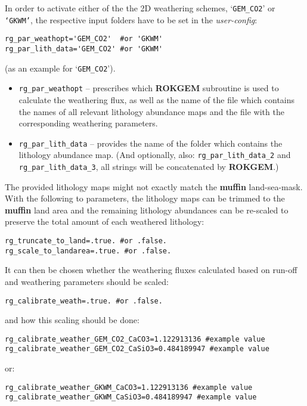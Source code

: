 \vspace{1mm}
In order to activate either of the the 2D weathering schemes, ‘\texttt{GEM\_CO2}’ or \texttt{‘GKWM’},  the respective input folders have to be set in the \textit{user-config}:
\vspace{-1mm}\small\begin{verbatim}
rg_par_weathopt='GEM_CO2'  #or 'GKWM' 
rg_par_lith_data='GEM_CO2' #or 'GKWM' 
\end{verbatim}\normalsize\vspace{-1mm}
(as an example for ‘\texttt{GEM\_CO2}’).

\begin{itemize}[noitemsep]
\item \texttt{rg\_par\_weathopt} -- prescribes which \textbf{ROKGEM} subroutine is used to calculate the weathering flux, as well as the name of the file which contains the names of all relevant lithology abundance maps and the file with the corresponding weathering parameters. 
\item \texttt{rg\_par\_lith\_data} -- provides the name of the folder which contains the lithology abundance map. (And optionally, also: \texttt{rg\_par\_lith\_data\_2} and \texttt{rg\_par\_lith\_data\_3}, all strings will be concatenated by \textbf{ROKGEM}.)
\end{itemize}

\vspace{1mm}
The provided lithology maps might not exactly match the \textbf{muffin} land-sea-mask. With the following to parameters, the lithology maps can be trimmed to the \textbf{muffin} land area and the remaining lithology abundances can be re-scaled to preserve the total amount of each weathered lithology:
\vspace{-1mm}\small\begin{verbatim}
rg_truncate_to_land=.true. #or .false.
rg_scale_to_landarea=.true. #or .false.
\end{verbatim}\normalsize\vspace{-1mm}
It can then be chosen whether the weathering fluxes calculated based on run-off and weathering parameters should be scaled:
\vspace{-1mm}\small\begin{verbatim}
rg_calibrate_weath=.true. #or .false.
\end{verbatim}\normalsize\vspace{-1mm}
and how this scaling should be done:
\vspace{-1mm}\small\begin{verbatim}
rg_calibrate_weather_GEM_CO2_CaCO3=1.122913136 #example value
rg_calibrate_weather_GEM_CO2_CaSiO3=0.484189947 #example value
\end{verbatim}\normalsize\vspace{-1mm}
or:
\vspace{-1mm}\small\begin{verbatim}
rg_calibrate_weather_GKWM_CaCO3=1.122913136 #example value
rg_calibrate_weather_GKWM_CaSiO3=0.484189947 #example value
\end{verbatim}\normalsize\vspace{-1mm}

